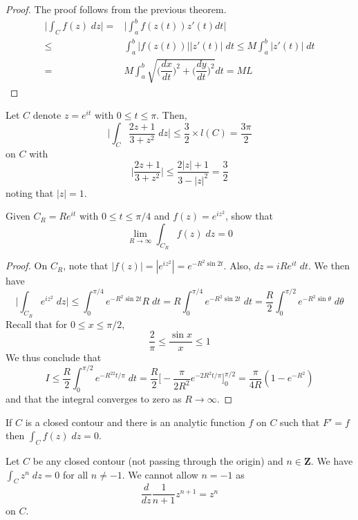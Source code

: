 \vspace{2ex}
\begin{proof}
The proof follows from the previous theorem.
\begin{align*}
	\Big|\int _{C}f(z)\;dz\Big|=&\Big|\int _{a}^{b}f(z(t))z'(t)dt\Big|\\
\leq& \int ^{b}_{a}|f(z(t))||z'(t)|\;dt\leq M\int ^{b}_{a}|z'(t)|\;dt\\
	=&M\int ^{b}_{a}\sqrt{\Big(\dfrac{d x}{d t} \Big)^2+\Big(\dfrac{d y}{d t} \Big)^2}dt=ML
\end{align*}
\end{proof}
\vspace{2ex}
\begin{ex}
Let $C$ denote $z=e^{it}$ with $0\leq t\leq \pi $. Then,
	\[\Big|\int _{C}\dfrac{2z+1}{3+z^2}\;dz\Big|\leq \dfrac{3}{2}\times l(C)=\dfrac{3\pi }{2}\] 
on $C$ with
\[\Big|\dfrac{2z+1}{3+z^2}\Big|\leq \dfrac{2|z|+1}{3-|z|^2}=\dfrac{3}{2}\]
noting that $|z|=1$.
\end{ex}
\vspace{2ex}
\begin{ex}
Given $C_{R}=Re^{it}$ with $0\leq t\leq \pi /4$ and $f(z)=e^{iz^2}$, show that 
\[\lim _{R\rightarrow \infty }\int _{C_{R}}f(z)\;dz=0\]
\end{ex}
\vspace{2ex}
\begin{proof}
On $C_{R}$, note that $|f(z)|=|e^{iz^2}|=e^{-R^2\sin 2t}$. Also, $dz=iRe^{it}\;dt$. We then have
\[\Big|\int _{C_{R}}e^{iz^2}\;dz\Big|\leq \int ^{\pi /4}_{0}e^{-R^2\sin 2t}R\;dt=R\int ^{\pi /4}_{0}e^{-R^2\sin 2t}\;dt=\dfrac{R}{2}\int ^{\pi /2}_{0}e^{-R^2\sin \theta }\;d\theta \]
Recall that for $0\leq x\leq \pi /2$,
\[\dfrac{2}{\pi }\leq \dfrac{\sin x}{x}\leq 1\]
We thus conclude that
	\[I\leq \dfrac{R}{2}\int ^{\pi /2}_{0}e^{-R^22t/\pi }\;dt=\dfrac{R}{2}\Big[-\dfrac{\pi }{2R^2}e^{-2R^2t/\pi }\Big]_{0}^{\pi /2}=\dfrac{\pi }{4R}(1-e^{-R^2})\]
and that the integral converges to zero as $R\rightarrow \infty $.
\end{proof}
\vspace{2ex}
\begin{thm}
	If $C$ is a closed contour and there is an analytic function $f$ on $C$ such that $F'=f$ then $\int _{C}f(z)\;dz=0$. 
\end{thm}
\vspace{2ex}
\begin{ex}
Let $C$ be any closed contour (not passing through the origin) and $n\in {\bm Z}$. We have $\int _{C}z^{n}\;dz=0$ for all $n\ne -1$. We cannot allow $n=-1$ as 
\[\dfrac{d }{d z}\dfrac{1}{n+1}z^{n+1}=z^{n} \]
on $C$. 
\end{ex}
